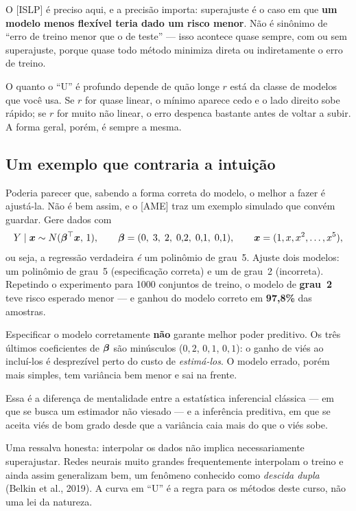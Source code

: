 \documentclass[11pt,a4paper]{article}
\begin{document}
\begin{atencao}
O [ISLP] é preciso aqui, e a precisão importa: superajuste é o caso em que
\textbf{um modelo menos flexível teria dado um risco menor}. Não é sinônimo de ``erro
de treino menor que o de teste'' --- isso acontece quase sempre, com ou sem
superajuste, porque quase todo método minimiza direta ou indiretamente o erro de
treino.
\end{atencao}

O quanto o ``U'' é profundo depende de quão longe $r$ está da classe de modelos que
você usa. Se $r$ for quase linear, o mínimo aparece cedo e o lado direito sobe rápido;
se $r$ for muito não linear, o erro despenca bastante antes de voltar a subir. A forma
geral, porém, é sempre a mesma.

\subsection{Um exemplo que contraria a intuição}
Poderia parecer que, sabendo a forma correta do modelo, o melhor a fazer é ajustá-la.
Não é bem assim, e o [AME] traz um exemplo simulado que convém guardar. Gere dados com
\[
  Y\mid \bm{x} \sim N(\bm{\beta}^\top\bm{x},\,1),\qquad
  \bm{\beta}=(0,\;3,\;2,\;0{,}2,\;0{,}1,\;0{,}1),\qquad
  \bm{x}=(1,x,x^2,\dots,x^5),
\]
ou seja, a regressão verdadeira \emph{é} um polinômio de grau~5. Ajuste dois modelos:
um polinômio de grau~5 (especificação correta) e um de grau~2 (incorreta). Repetindo
o experimento para 1000 conjuntos de treino, o modelo de \textbf{grau~2} teve risco
esperado menor --- e ganhou do modelo correto em \textbf{97,8\%} das amostras.

\begin{ideia}
Especificar o modelo corretamente \textbf{não} garante melhor poder preditivo. Os
três últimos coeficientes de $\bm{\beta}$ são minúsculos ($0{,}2$, $0{,}1$, $0{,}1$): o
ganho de viés ao incluí-los é desprezível perto do custo de \emph{estimá-los}. O
modelo errado, porém mais simples, tem variância bem menor e sai na frente.
\end{ideia}

\noindent
Essa é a diferença de mentalidade entre a estatística inferencial clássica --- em que
se busca um estimador não viesado --- e a inferência preditiva, em que se aceita viés
de bom grado desde que a variância caia mais do que o viés sobe.

\begin{observacao}
Uma ressalva honesta: interpolar os dados não implica necessariamente superajustar.
Redes neurais muito grandes frequentemente interpolam o treino e ainda assim
generalizam bem, um fenômeno conhecido como \emph{descida dupla} (Belkin et al.,
2019). A curva em ``U'' é a regra para os métodos deste curso, não uma lei da
natureza.
\end{observacao}
\end{document}

